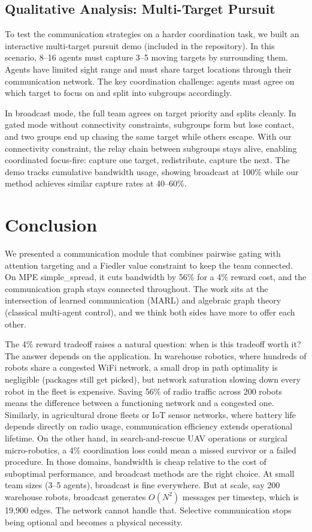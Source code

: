 \documentclass[letterpaper, 10 pt, journal, twoside]{IEEEtran}
\begin{document}
\subsection{Qualitative Analysis: Multi-Target Pursuit}

To test the communication strategies on a harder coordination task, we built an interactive multi-target pursuit demo (included in the repository). In this scenario, 8--16 agents must capture 3--5 moving targets by surrounding them. Agents have limited sight range and must share target locations through their communication network. The key coordination challenge: agents must agree on which target to focus on and split into subgroups accordingly.

In broadcast mode, the full team agrees on target priority and splits cleanly. In gated mode without connectivity constraints, subgroups form but lose contact, and two groups end up chasing the same target while others escape. With our connectivity constraint, the relay chain between subgroups stays alive, enabling coordinated focus-fire: capture one target, redistribute, capture the next. The demo tracks cumulative bandwidth usage, showing broadcast at 100\% while our method achieves similar capture rates at 40--60\%.

\section{Conclusion}

We presented a communication module that combines pairwise gating with attention targeting and a Fiedler value constraint to keep the team connected. On MPE simple\_spread, it cuts bandwidth by 56\% for a 4\% reward cost, and the communication graph stays connected throughout. The work sits at the intersection of learned communication (MARL) and algebraic graph theory (classical multi-agent control), and we think both sides have more to offer each other.

The 4\% reward tradeoff raises a natural question: when is this tradeoff worth it? The answer depends on the application. In warehouse robotics, where hundreds of robots share a congested WiFi network, a small drop in path optimality is negligible (packages still get picked), but network saturation slowing down every robot in the fleet is expensive. Saving 56\% of radio traffic across 200 robots means the difference between a functioning network and a congested one. Similarly, in agricultural drone fleets or IoT sensor networks, where battery life depends directly on radio usage, communication efficiency extends operational lifetime. On the other hand, in search-and-rescue UAV operations or surgical micro-robotics, a 4\% coordination loss could mean a missed survivor or a failed procedure. In those domains, bandwidth is cheap relative to the cost of suboptimal performance, and broadcast methods are the right choice. At small team sizes (3--5 agents), broadcast is fine everywhere. But at scale, say 200 warehouse robots, broadcast generates $O(N^2)$ messages per timestep, which is 19,900 edges. The network cannot handle that. Selective communication stops being optional and becomes a physical necessity.
\end{document}
